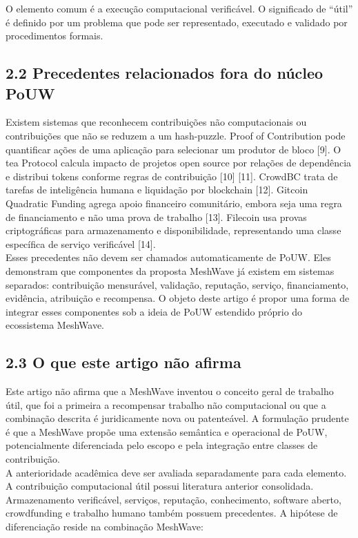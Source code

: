 \documentclass[12pt,a4paper]{article}
\begin{document}
O elemento comum é a execução computacional verificável. O significado de “útil” é definido por um problema que pode ser representado, executado e validado por procedimentos formais.\\

\subsection{2.2 Precedentes relacionados fora do núcleo PoUW}

Existem sistemas que reconhecem contribuições não computacionais ou contribuições que não se reduzem a um hash-puzzle. Proof of Contribution pode quantificar ações de uma aplicação para selecionar um produtor de bloco [9]. O tea Protocol calcula impacto de projetos open source por relações de dependência e distribui tokens conforme regras de contribuição [10] [11]. CrowdBC trata de tarefas de inteligência humana e liquidação por blockchain [12]. Gitcoin Quadratic Funding agrega apoio financeiro comunitário, embora seja uma regra de financiamento e não uma prova de trabalho [13]. Filecoin usa provas criptográficas para armazenamento e disponibilidade, representando uma classe específica de serviço verificável [14].\\

Esses precedentes não devem ser chamados automaticamente de PoUW. Eles demonstram que componentes da proposta MeshWave já existem em sistemas separados: contribuição mensurável, validação, reputação, serviço, financiamento, evidência, atribuição e recompensa. O objeto deste artigo é propor uma forma de integrar esses componentes sob a ideia de PoUW estendido próprio do ecossistema MeshWave.\\

\subsection{2.3 O que este artigo não afirma}

Este artigo não afirma que a MeshWave inventou o conceito geral de trabalho útil, que foi a primeira a recompensar trabalho não computacional ou que a combinação descrita é juridicamente nova ou patenteável. A formulação prudente é que a MeshWave propõe uma extensão semântica e operacional de PoUW, potencialmente diferenciada pelo escopo e pela integração entre classes de contribuição.\\

A anterioridade acadêmica deve ser avaliada separadamente para cada elemento. A contribuição computacional útil possui literatura anterior consolidada. Armazenamento verificável, serviços, reputação, conhecimento, software aberto, crowdfunding e trabalho humano também possuem precedentes. A hipótese de diferenciação reside na combinação MeshWave:\\
\end{document}
